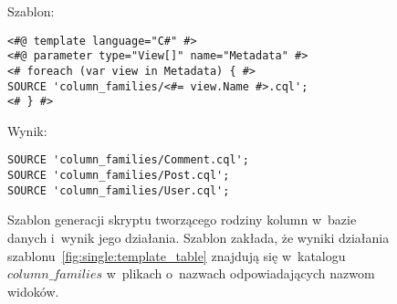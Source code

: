 \begin{figure}[!ht]
Szablon:

\begin{verbatim}
<#@ template language="C#" #>
<#@ parameter type="View[]" name="Metadata" #>
<# foreach (var view in Metadata) { #>
SOURCE 'column_families/<#= view.Name #>.cql';
<# } #>
\end{verbatim}

Wynik:

\begin{verbatim}
SOURCE 'column_families/Comment.cql';
SOURCE 'column_families/Post.cql';
SOURCE 'column_families/User.cql';
\end{verbatim}

\caption{
 Szablon generacji skryptu tworzącego rodziny kolumn w~bazie danych i~wynik jego działania.
 Szablon zakłada, że wyniki działania szablonu~\ref{fig:single:template_table} znajdują się w~katalogu $column\_families$ w~plikach o~nazwach odpowiadających nazwom widoków.
}
\label{fig:single:template_script}
\end{figure}
